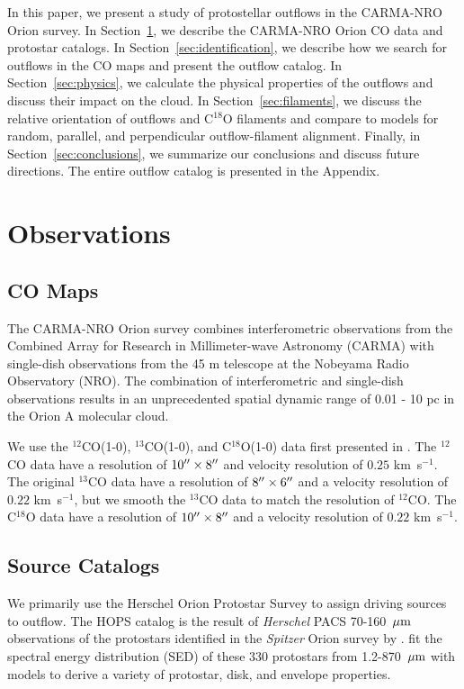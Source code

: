 \documentclass[twocolumn]{aastex63}
\newcommand{\kms}{km~s$^{-1}$}
\newcommand{\co}[1][]{\ensuremath{^{#1}}CO}
\begin{document}
In this paper, we present a study of protostellar outflows in the CARMA-NRO Orion survey. In Section~\ref{sec:observations}, we describe the CARMA-NRO Orion CO data and protostar catalogs. In Section~\ref{sec:identification}, we describe how we search for outflows in the CO maps and present the outflow catalog. In Section~\ref{sec:physics}, we calculate the physical properties of the outflows and discuss their impact on the cloud. In Section~\ref{sec:filaments}, we discuss the relative orientation of outflows and C$^{18}$O filaments and compare to models for random, parallel, and perpendicular outflow-filament alignment. Finally, in Section~\ref{sec:conclusions}, we summarize our conclusions and discuss future directions. The entire outflow catalog is presented in the Appendix.


\section{Observations}\label{sec:observations}

\subsection{CO Maps}
The CARMA-NRO Orion survey combines interferometric observations from the Combined Array for Research in Millimeter-wave Astronomy (CARMA) with single-dish observations from the 45 m telescope at the Nobeyama Radio Observatory (NRO). The combination of interferometric and single-dish observations results in an unprecedented spatial dynamic range of 0.01 - 10 pc in the Orion A molecular cloud.

We use the \co[12](1-0), \co[13](1-0), and C$^{18}$O(1-0) data first presented in \citet{Kong18}. The \co[12]{} data have a resolution of $10\mbox{$^{\prime\prime}$}\times8\mbox{$^{\prime\prime}$}$ and velocity resolution of $0.25$ \kms{}. The original \co[13] data have a resolution of $8\mbox{$^{\prime\prime}$}\times6\mbox{$^{\prime\prime}$}$ and a velocity resolution of $0.22$ \kms{}, but we smooth the \co[13]{} data to match the resolution of \co[12]{}. The C$^{18}$O data have a resolution of $10\mbox{$^{\prime\prime}$}\times8\mbox{$^{\prime\prime}$}$ and a velocity resolution of $0.22$ \kms{}.

\subsection{Source Catalogs}
We primarily use the Herschel Orion Protostar Survey \citep[HOPS;][]{Furlan16} to assign driving sources to outflow. The HOPS catalog is the result of \emph{Herschel} PACS 70-160~$\mbox{$\mu$m}{}$ observations of the protostars identified in the \emph{Spitzer} Orion survey by \citet{Megeath12}. \citet{Furlan16} fit the spectral energy distribution (SED) of these 330 protostars from 1.2-870~$\mbox{$\mu$m}{}$ with models to derive a variety of protostar, disk, and envelope properties.
\end{document}
